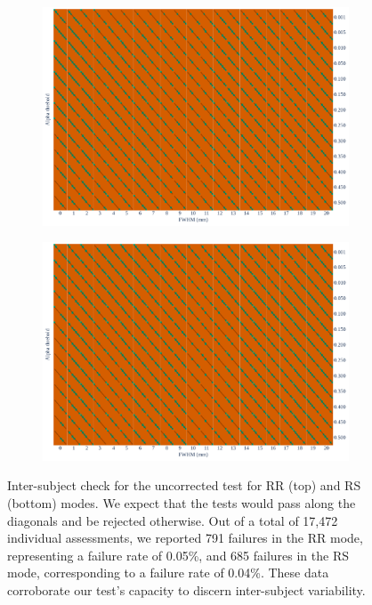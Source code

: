 \documentclass[lettersize,journal]{IEEEtran}
\begin{document}

    \begin{figure}
        \centering
        \begin{subfigure}[t]{0.7\linewidth}
            \includegraphics[width=\linewidth]{figures/inter-subject/one_pce_RR.pdf}
        \end{subfigure}
        \begin{subfigure}[t]{0.7\linewidth}
            \includegraphics[width=\linewidth]{figures/inter-subject/one_pce_RS.pdf}
        \end{subfigure}
        \caption{Inter-subject check for the uncorrected test for RR (top) and RS (bottom) modes. We expect that the tests would pass along the diagonals and be rejected otherwise.
            Out of a total of 17,472 individual assessments, we reported 791 failures in the RR mode, representing a failure rate of 0.05\%, and 685 failures in the RS mode, corresponding to a failure rate of 0.04\%. These data corroborate our test's capacity to discern inter-subject variability.
        }
        \label{fig:ieee-check-pce}
    \end{figure}
\end{document}
